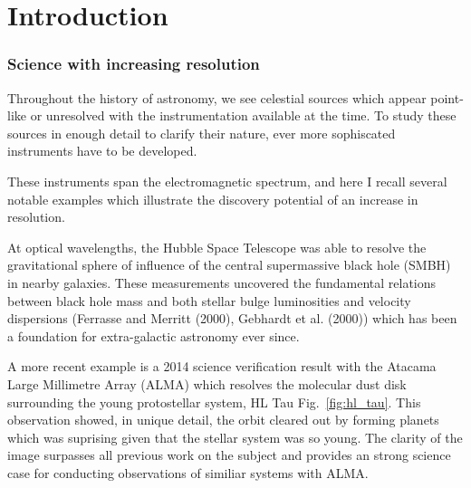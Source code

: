 \chapter{Introduction}
\subsection{Science with increasing resolution}




Throughout the history of astronomy, we see celestial sources which appear point-like or unresolved with the instrumentation available at the time. To study these sources in enough detail to clarify their nature, ever more sophiscated instruments have to be developed. 

These instruments span the electromagnetic spectrum, and here I recall several notable examples which illustrate the discovery potential of an increase in resolution.

At optical wavelengths, the Hubble Space Telescope was able to resolve the gravitational sphere of influence of the central supermassive black hole (SMBH) in nearby galaxies. These measurements uncovered the fundamental relations between black hole mass and both stellar bulge luminosities and velocity dispersions (Ferrasse and Merritt (2000), Gebhardt et al. (2000)) which has been a foundation for extra-galactic astronomy ever since. 

A more recent example is a 2014 science verification result with the Atacama Large Millimetre Array (ALMA) \cite{brogan_2015} which resolves the molecular dust disk surrounding the young protostellar system, HL Tau Fig.~\ref{fig:hl_tau}. This observation showed, in unique detail, the orbit cleared out by forming planets which was suprising given that the stellar system was so young. The clarity of the image surpasses all previous work on the subject and provides an strong science case for conducting observations of similiar systems with ALMA. 


